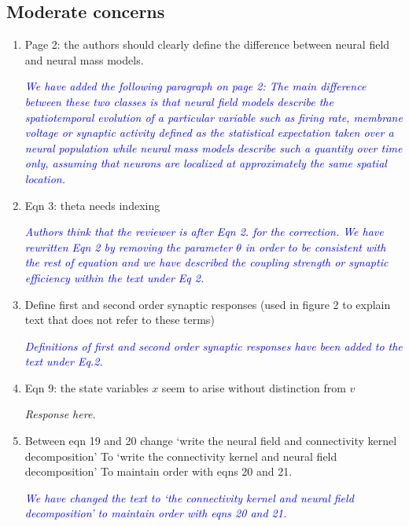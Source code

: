 \documentclass{article}
\newcommand{\parham}[1]{\textcolor{blue}{#1}}
\begin{document}
			\subsection{Moderate concerns} 
			\begin{enumerate} 
			 \item Page 2: the authors should clearly define the difference between neural field and neural mass models.
			
			\emph{\parham{We have added the following paragraph on page 2: The main difference between these two classes is that neural field models describe the spatiotemporal evolution of a particular variable such as firing rate, membrane voltage or synaptic activity defined as the statistical expectation taken over a neural population while neural mass models describe such a quantity over time only, assuming that neurons are localized at approximately the same spatial location.}}
			
			\item Eqn 3: theta needs indexing 
 
			\emph{\parham{Authors think that the reviewer is after Eqn 2. for the correction.  We have rewritten Eqn 2 by removing the parameter $\theta$ in order to be consistent with the rest of equation and we have described the coupling strength or synaptic efficiency within the text under Eq 2.}}
 			
			\item Define first and second order synaptic responses (used in figure 2 to explain text that does not refer to these terms)
			
			\emph{\parham{Definitions of first and second order synaptic responses have been added to the text under Eq.2.}}
			
			\item{Eqn 9: the state variables $x$ seem to arise without distinction from $v$}  
			
			\emph{Response here.}
			
			\item Between eqn 19 and 20 change
			`write the neural field and connectivity kernel decomposition' To `write the connectivity kernel and neural field decomposition'
			To maintain order with eqns 20 and 21.

			\emph{\parham{We have changed the text to `the connectivity kernel and neural field decomposition' to maintain order with eqns 20 and 21.}}
			
			 
			 \end{enumerate}  
\end{document}
